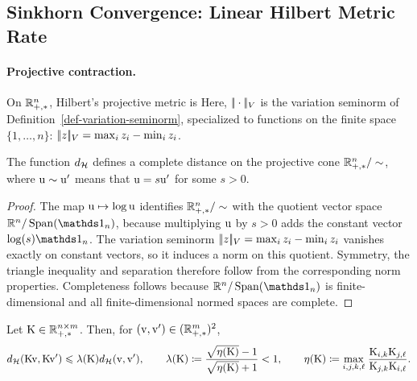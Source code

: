 \subsection{Sinkhorn Convergence: Linear Hilbert Metric Rate}
\label{sec-sinkhorn-hilbert}
\paragraph{Projective contraction.}
\begin{defn}\label{def-hilbert-metric}
On $\mathbb{R}_{+,*}^n$, Hilbert's projective metric is
Here, $|\!| \cdot |\!|_V$ is the variation seminorm of Definition~\ref{def-variation-seminorm}, specialized to functions on the finite space $\{1,\ldots,n\}$: $|\!| z |\!|_V=\max_i z_i-\min_i z_i$.
\end{defn}
\begin{prop}
The function $d_{\mathcal{H}}$ defines a complete distance on the projective cone $\mathbb{R}_{+,*}^n/\sim$, where $\mathrm{u} \sim \mathrm{u}'$ means that $\mathrm{u}=s\mathrm{u}'$ for some $s>0$.
\end{prop}
\begin{proof}
The map $\mathrm{u} \mapsto \log \mathrm{u}$ identifies $\mathbb{R}_{+,*}^n/\sim$ with the quotient vector space $\RR^n/\Span(\ones_n)$, because multiplying $\mathrm{u}$ by $s>0$ adds the constant vector $\log(s)\ones_n$. The variation seminorm $|\!| z |\!|_V=\max_i z_i-\min_i z_i$ vanishes exactly on constant vectors, so it induces a norm on this quotient. Symmetry, the triangle inequality and separation therefore follow from the corresponding norm properties. Completeness follows because $\RR^n/\Span(\ones_n)$ is finite-dimensional and all finite-dimensional normed spaces are complete.
\end{proof}
\begin{thm}\label{thm-birkhoff}
Let $\mathrm{K} \in \mathbb{R}_{+,*}^{n \times m}$. Then, for $(\mathrm{v},\mathrm{v}') \in (\mathbb{R}_{+,*}^m)^2$,
\[
d_{\mathcal{H}}(\mathrm{K} \mathrm{v},\mathrm{K} \mathrm{v}') \leqslant \lambda(\mathrm{K}) d_{\mathcal{H}}(\mathrm{v},\mathrm{v}'),
\qquad
\lambda(\mathrm{K}) \coloneqq \frac{\sqrt{\eta(\mathrm{K})}-1}{\sqrt{\eta(\mathrm{K})}+1}<1,
\qquad
\eta(\mathrm{K}) \coloneqq \underset{i,j,k,\ell}{\max}\;\frac{\mathrm{K}_{i,k}\mathrm{K}_{j,\ell}}{\mathrm{K}_{j,k}\mathrm{K}_{i,\ell}}.
\]
\end{thm}
